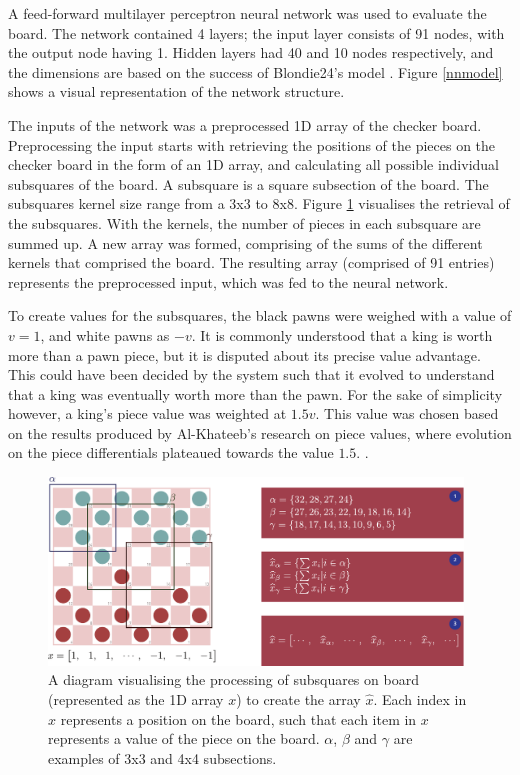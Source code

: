 \documentclass[12pt,a4paper]{article}
\begin{document}
        A feed-forward multilayer perceptron neural network was used to evaluate the board. The network contained 4 layers; the input layer consists of 91 nodes, with the output node having 1. Hidden layers had 40 and 10 nodes respectively, and the dimensions are based on the success of Blondie24's model \cite{chellapilla_evolving_1999}. Figure \ref{nnmodel} shows a visual representation of the network structure.

        The inputs of the network was a preprocessed 1D array of the checker board. Preprocessing the input starts with retrieving the positions of the pieces on the checker board in the form of an 1D array, and calculating all possible individual subsquares of the board. A subsquare is a square subsection of the board. The subsquares kernel size range from a 3x3 to 8x8. Figure \ref{subsquares} visualises the retrieval of the subsquares. With the kernels, the number of pieces in each subsquare are summed up. A new array was formed, comprising of the sums of the different kernels that comprised the board. The resulting array (comprised of 91 entries) represents the preprocessed input, which was fed to the neural network.
        
        To create values for the subsquares, the black pawns were weighed with a value of $v=1$, and white pawns as $-v$. It is commonly understood that a king is worth more than a pawn piece, but it is disputed about its precise value advantage. This could have been decided by the system such that it evolved to understand that a king was eventually worth more than the pawn. For the sake of simplicity however, a king's piece value was weighted at $1.5v$. This value was chosen based on the results produced by Al-Khateeb's research on piece values, where evolution on the piece differentials plateaued towards the value $1.5$. \cite{al-khateeb_importance_2010}.

        \begin{figure}[!ht]
            \centering
            \includegraphics[width=110mm]{images/subsquares.pdf}
            \caption{A diagram visualising the processing of subsquares on board (represented as the 1D array $x$) to create the array $\widehat{x}$. Each index in $x$ represents a position on the board, such that each item in $x$ represents a value of the piece on the board. $\alpha$, $\beta$ and $\gamma$ are examples of 3x3 and 4x4 subsections. \label{subsquares}}
        \end{figure}
\end{document}
